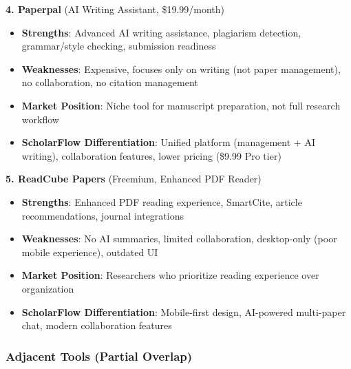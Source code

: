 \textbf{4. Paperpal} (AI Writing Assistant, \$19.99/month)
\begin{itemize}
    \item \textbf{Strengths}: Advanced AI writing assistance, plagiarism detection, grammar/style checking, submission readiness
    \item \textbf{Weaknesses}: Expensive, focuses only on writing (not paper management), no collaboration, no citation management
    \item \textbf{Market Position}: Niche tool for manuscript preparation, not full research workflow
    \item \textbf{ScholarFlow Differentiation}: Unified platform (management + AI writing), collaboration features, lower pricing (\$9.99 Pro tier)
\end{itemize}

\textbf{5. ReadCube Papers} (Freemium, Enhanced PDF Reader)
\begin{itemize}
    \item \textbf{Strengths}: Enhanced PDF reading experience, SmartCite, article recommendations, journal integrations
    \item \textbf{Weaknesses}: No AI summaries, limited collaboration, desktop-only (poor mobile experience), outdated UI
    \item \textbf{Market Position}: Researchers who prioritize reading experience over organization
    \item \textbf{ScholarFlow Differentiation}: Mobile-first design, AI-powered multi-paper chat, modern collaboration features
\end{itemize}

\subsubsection{Adjacent Tools (Partial Overlap)}

